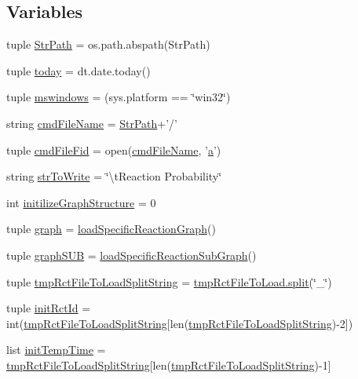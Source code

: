 \subsection*{Variables}
\begin{DoxyCompactItemize}
\item 
tuple \hyperlink{a00102_af8add8b37a9c8a7825c0e8f0e7dfd6c1}{Str\-Path} = os.\-path.\-abspath(Str\-Path)
\item 
tuple \hyperlink{a00102_a5498b0a6851ae4d3b2c3035093564e47}{today} = dt.\-date.\-today()
\item 
tuple \hyperlink{a00102_a2abf09620dd1dd990036c67c626b3dee}{mswindows} = (sys.\-platform == \char`\"{}win32\char`\"{})
\item 
string \hyperlink{a00102_a32551f85ad3cd8080b8ad81828276368}{cmd\-File\-Name} = \hyperlink{a00102_af8add8b37a9c8a7825c0e8f0e7dfd6c1}{Str\-Path}+'/'
\item 
tuple \hyperlink{a00102_a0a501feb02e67bd6a8ba75490709cf89}{cmd\-File\-Fid} = open(\hyperlink{a00102_a32551f85ad3cd8080b8ad81828276368}{cmd\-File\-Name}, '\hyperlink{a00035_a2ffdbad9ea59541e59cbd2b938e0770c}{a}')
\item 
string \hyperlink{a00102_a1966f0657c6b477eeb60bde732a201cc}{str\-To\-Write} = \char`\"{}\textbackslash{}t\-Reaction Probability\char`\"{}
\item 
int \hyperlink{a00102_ac6ad18bfc83e8ea3254897d46f990855}{initilize\-Graph\-Structure} = 0
\item 
tuple \hyperlink{a00102_ab45392da38059bf7557c22cbc73e5580}{graph} = \hyperlink{a00102_a7517a12f1c90a0ae0e997161079676bd}{load\-Specific\-Reaction\-Graph}()
\item 
tuple \hyperlink{a00102_ae307841da4a073fad4f6eaa172b0b970}{graph\-S\-U\-B} = \hyperlink{a00102_ab9d3c9c8514469b4dea42d8caacb3937}{load\-Specific\-Reaction\-Sub\-Graph}()
\item 
tuple \hyperlink{a00102_add910e17b3f1fe61cdbaf8ce60ec0e20}{tmp\-Rct\-File\-To\-Load\-Split\-String} = \hyperlink{a00076_a4d1aa74fac80ae0275c056575fdb6626}{tmp\-Rct\-File\-To\-Load.\-split}(\char`\"{}\-\_\-\char`\"{})
\item 
tuple \hyperlink{a00102_a212643643fc6b002e8797f16633bb16d}{init\-Rct\-Id} = int(\hyperlink{a00102_add910e17b3f1fe61cdbaf8ce60ec0e20}{tmp\-Rct\-File\-To\-Load\-Split\-String}\mbox{[}len(\hyperlink{a00102_add910e17b3f1fe61cdbaf8ce60ec0e20}{tmp\-Rct\-File\-To\-Load\-Split\-String})-\/2\mbox{]})
\item 
list \hyperlink{a00102_adc4403c4cfe080918c8b9da692c50509}{init\-Temp\-Time} = \hyperlink{a00102_add910e17b3f1fe61cdbaf8ce60ec0e20}{tmp\-Rct\-File\-To\-Load\-Split\-String}\mbox{[}len(\hyperlink{a00102_add910e17b3f1fe61cdbaf8ce60ec0e20}{tmp\-Rct\-File\-To\-Load\-Split\-String})-\/1\mbox{]}

\end{DoxyCompactItemize}

